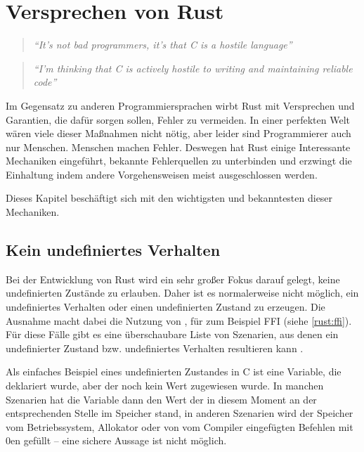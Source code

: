 \section{Versprechen von Rust}
\label{rust:guarantees}

\begin{quotation}
	\textit{\enquote{It’s not bad programmers, it’s that C is a hostile language}} 
	\cite[54]{rust:c_is_hostile_mena}
\end{quotation}

\begin{quotation}
	\textit{\enquote{I’m thinking that C is actively hostile to writing and maintaining reliable code}} 
	\cite[129]{rust:c_is_hostile_mena}
\end{quotation}

Im Gegensatz zu anderen Programmiersprachen wirbt Rust mit Versprechen und Garantien, die dafür sorgen sollen, Fehler zu vermeiden.
In einer perfekten Welt wären viele dieser Maßnahmen nicht nötig, aber leider sind Programmierer auch nur Menschen.
Menschen machen Fehler.
Deswegen hat Rust einige Interessante Mechaniken eingeführt, bekannte Fehlerquellen zu unterbinden und erzwingt die Einhaltung indem andere Vorgehensweisen meist ausgeschlossen werden.

Dieses Kapitel beschäftigt sich mit den wichtigsten und bekanntesten dieser Mechaniken.

\subsection{Kein undefiniertes Verhalten}
\label{rust:no_unitialized_usage}
\label{rust:no_undefined}

Bei der Entwicklung von Rust wird ein sehr großer Fokus darauf gelegt, keine undefinierten Zustände zu erlauben.
Daher ist es normalerweise nicht möglich, ein undefiniertes Verhalten oder einen undefinierten Zustand zu erzeugen.
Die Ausnahme macht dabei die Nutzung von , für zum Beispiel FFI (siehe \autoref{rust:ffi}).
Für diese Fälle gibt es eine überschaubare Liste von Szenarien, aus denen ein undefinierter Zustand bzw. undefiniertes Verhalten resultieren kann \cite{rust:book:undefined}.

Als einfaches Beispiel eines undefinierten Zustandes in C ist eine Variable, die deklariert wurde, aber der noch kein Wert zugewiesen wurde.
In manchen Szenarien hat die Variable dann den Wert der in diesem Moment an der entsprechenden Stelle im Speicher stand, in anderen Szenarien wird der Speicher vom Betriebssystem, Allokator oder von vom Compiler eingefügten Befehlen mit 0en gefüllt -- eine sichere Aussage ist nicht möglich.

